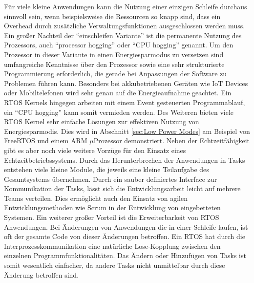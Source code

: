 Für viele kleine Anwendungen kann die Nutzung einer einzigen Schleife durchaus sinnvoll sein, wenn beispielsweise die Ressourcen so knapp sind, dass ein Overhead durch zusätzliche Verwaltungsfunktionen ausgeschlossen werden muss. Ein großer Nachteil der "`einschleifen Variante"' ist die permanente Nutzung des Prozessors, auch "`processor hogging"' oder "`CPU hogging"' genannt. Um den Prozessor in dieser Variante in einen Energiesparmodus zu versetzen sind umfangreiche Kenntnisse über den Prozessor sowie eine sehr strukturierte Programmierung erforderlich, die gerade bei Anpassungen der Software zu Problemen führen kann. Besonders bei akkubetriebenen Geräten wie IoT Devices oder Mobiltelefonen wird sehr genau auf die Energieaufnahme geachtet. Ein RTOS Kernels hingegen arbeiten mit einem Event gesteuerten Programmablauf, ein "`CPU hogging"' kann somit vermieden werden. Des Weiteren bieten viele RTOS Kernel sehr einfache Lösungen zur effektiven Nutzung von Energiesparmodis. Dies wird in Abschnitt \ref{sec:Low Power Modes} am Beispiel von FreeRTOS und einem ARM $\mu$Prozessor demonstriert. Neben der Echt\-zeit\-fähig\-keit gibt es aber noch viele weitere Vorzüge für den Einsatz eines Echtzeitbetriebssystems. Durch das Herunterbrechen der Anwendungen in Tasks entstehen viele kleine Module, die jeweils eine kleine Teilaufgabe des Gesamtsystems über\-neh\-men. Durch ein sauber definiertes Interface zur Kommunikation der Tasks, lässt sich die Entwicklungsarbeit leicht auf mehrere Teams verteilen. Dies ermöglicht auch den Einsatz von agilen Entwicklungsmethoden wie Scrum in der Entwicklung von eingebetteten Systemen. Ein weiterer großer Vorteil ist die Erweiterbarkeit von RTOS Anwendungen. Bei Änderungen von Anwendungen die in einer Schleife laufen, ist oft der gesamte Code von dieser Änderungen betroffen. Ein RTOS hat durch die Interprozesskommunikation eine natürliche Lose-Kopplung zwischen den einzelnen Programmfunktionalitäten. Das Än\-dern oder Hinzufügen von Tasks ist somit wesentlich einfacher, da andere Tasks nicht unmittelbar durch diese Än\-der\-ung betroffen sind. 




